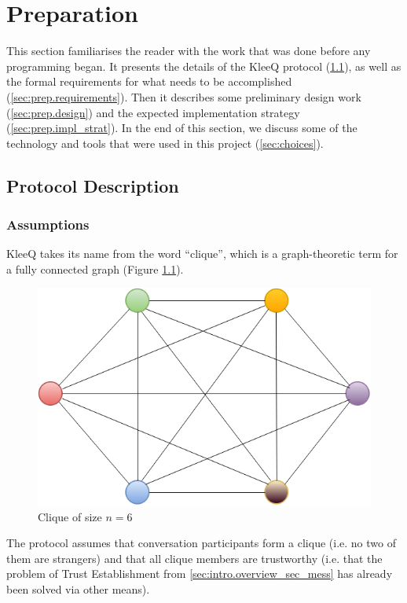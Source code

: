 \documentclass[a4paper, 12pt]{report}
\begin{document}
\chapter{Preparation}
\label{ch:prep}
This section familiarises the reader with the work that was done before any programming began. It presents the details of the KleeQ protocol (\cref{sec:prep.proto}), as well as the formal requirements for what needs to be accomplished (\cref{sec:prep.requirements}). Then it describes some preliminary design work (\cref{sec:prep.design}) and the expected implementation strategy (\cref{sec:prep.impl_strat}). In the end of this section, we discuss some of the technology and tools that were used in this project (\cref{sec:choices}).

\section{Protocol Description}
\label{sec:prep.proto}

\subsection{Assumptions}
KleeQ takes its name from the word ``clique'', which is a graph-theoretic term for a fully connected graph (Figure \ref{fig:clique}).
\begin{figure}[h]
    \centering
    \includegraphics[scale = 0.5]{pics/clique.png}
    \caption{Clique of size $n = 6$ \label{fig:clique}}
\end{figure}
The protocol assumes that conversation participants form a clique (i.e. no two of them are strangers) and that all clique members are trustworthy (i.e. that the problem of Trust Establishment from \cref{sec:intro.overview_sec_mess} has already been solved via other means). 
\end{document}
